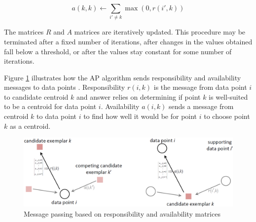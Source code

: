 \documentclass[../UNBThesis2.tex]{subfiles}
\begin{document}
\begin{itemize}
    \begin{equation}
        a(k, k) \leftarrow \sum\limits_{i' \neq k}\max(0, r(i', k))
    \end{equation}
  
  The matrices $R$ and $A$ matrices are iteratively updated. This procedure may be terminated after a fixed number of iterations, after changes in the values obtained fall below a threshold, or after the values stay constant for some number of iterations.
  
  
  

  Figure \ref{abc} illustrates how the AP algorithm sends responsibility and availability messages to data points \protect\cite{dueck2009affinity}. Responsibility $r(i,k)$ is the message from data point $i$ to candidate centroid $k$ and answer relies on determining if point $k$ is well-suited to be a centroid for data point $i$. Availability $a(i,k)$ sends a message from centroid $k$ to data point $i$ to find how well it would be for point $i$ to choose point $k$ as a centroid. 
    


    \begin{figure}
    \centering
    \includegraphics[width = 13 cm]{image/Chapters/Chapter2/APmessage.PNG}
    \caption{Message passing based on responsibility and availability matrices}
    \label{abc}
    \end{figure}



\end{itemize}
\end{document}
